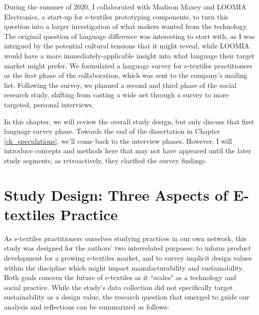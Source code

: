 
During the summer of 2020, I collaborated with Madison Maxey and LOOMIA Electronics, a start-up for e-textiles prototyping components, to turn this question into a larger investigation of what makers wanted from the technology. The original question of language difference was interesting to start with, as I was intrigued by the potential cultural tensions that it might reveal, while LOOMIA would have a more immediately-applicable insight into what language their target market might prefer. We formulated a language survey for e-textiles practitioners as the first phase of the collaboration, which was sent to the company's mailing list.
Following the survey, we planned a second and third phase of the social research study, shifting from casting a wide net through a survey to more targeted, personal interviews.

In this chapter, we will review the overall study design, but only discuss that first language survey phase. Towards the end of the dissertation in Chapter \ref{ch_speculations}, we'll come back to the interview phases. However, I will introduce concepts and methods here that may not have appeared until the later study segments, as retroactively, they clarified the survey findings.

\section{Study Design: Three Aspects of E-textiles Practice}

As e-textiles practitioners ourselves studying practices in our own network, this study was designed for the authors' two interrelated purposes: to inform product development for a growing e-textiles market, and to survey implicit design values within the discipline which might impact manufacturability and sustainability. Both goals concern the future of e-textiles as it ``scales" as a technology and social practice. While the study's data collection did not specifically target sustainability as a design value, the research question that emerged to guide our analysis and reflections can be summarized as follows:

